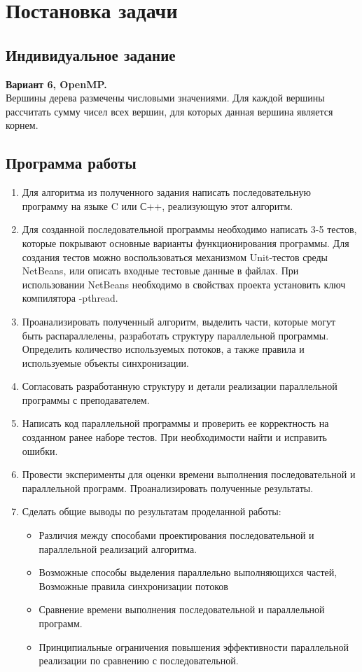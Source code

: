 


\tableofcontents
\clearpage

\section{Постановка задачи}
\subsection{Индивидуальное задание}
\textbf{Вариант 6, OpenMP.}\\
Вершины дерева размечены числовыми значениями. Для каждой вершины рассчитать сумму чисел всех вершин, для которых данная вершина является корнем.
\subsection{Программа работы}
\begin{enumerate}
\item Для алгоритма из полученного задания написать последовательную программу на языке C или С++, реализующую этот алгоритм.
\item Для созданной последовательной программы необходимо написать 3-5 тестов, которые покрывают основные варианты функционирования программы. Для создания тестов можно воспользоваться механизмом Unit-тестов среды NetBeans, или описать входные тестовые данные в файлах. При использовании NetBeans необходимо в свойствах проекта установить ключ компилятора -pthread.
\item Проанализировать полученный алгоритм, выделить части, которые могут быть распараллелены, разработать структуру параллельной программы. Определить количество используемых потоков, а также правила и используемые объекты синхронизации.
\item Согласовать разработанную структуру и детали реализации параллельной программы с преподавателем.
\item Написать код параллельной программы и проверить ее корректность на созданном ранее наборе тестов. При необходимости найти и исправить ошибки.
\item Провести эксперименты для оценки времени выполнения последовательной и параллельной программ. Проанализировать полученные результаты.
\item Сделать общие выводы по результатам проделанной работы: 
\begin{itemize}
\item Различия между способами проектирования последовательной и параллельной реализаций алгоритма.
\item Возможные способы выделения параллельно выполняющихся частей, Возможные правила синхронизации потоков
\item Сравнение времени выполнения последовательной и параллельной программ.
\item Принципиальные ограничения повышения эффективности параллельной реализации по сравнению с последовательной.
\end{itemize}
\end{enumerate}

